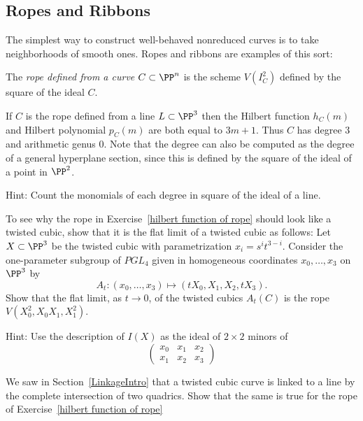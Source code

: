 \subsection{Ropes and Ribbons}
The simplest way to construct well-behaved nonreduced curves is
to take neighborhoods of smooth ones. Ropes and ribbons are examples of this sort:


\begin{definition}
The \emph{rope defined from a curve $C \subset \PP^n$} is the scheme $V(I^2_C)$ defined by the square of the ideal $C$.
\end{definition}

\begin{exercise}\label{hilbert function of rope}
If $C$ is the rope defined from a line $L\subset \PP^3$ then the Hilbert function $h_C(m)$ and Hilbert polynomial $p_C(m)$ are both equal to $3m+1$. Thus $C$ has degree 3 and
arithmetic genus 0. Note that the degree can also be computed as the degree of 
a general hyperplane section, since this is defined by the square of the ideal of a point
in $\PP^2$.

Hint: Count the monomials of each degree in square of the ideal of a line. 
\end{exercise}

\begin{exercise} To see why the rope in Exercise~\ref{hilbert function of rope} should look like a twisted cubic, show that it is the flat limit of a twisted cubic as follows:
 Let $X \subset \PP^3$ be the twisted cubic with parametrization $x_i = s^it^{3-i}$. Consider the one-parameter subgroup of $PGL_4$ given in homogeneous coordinates $x_0,\dots, x_3$ on $\PP^3$ by
$$
A_t : (x_0,\dots,x_3) \mapsto (tX_0, X_1, X_2,tX_3).
$$
Show that the flat limit, as $t\to 0$, of the twisted cubics $A_t(C)$ is the rope $V(X_0^2, X_0X_1,X_1^2)$.

Hint: Use the description of $I(X)$ as the ideal of $2\times 2$ minors of
$$
\begin{pmatrix}
 x_0 &x_1&x_2\\
x_1& x_2& x_3
\end{pmatrix}
$$
\end{exercise}
 
 
\begin{exercise}\label{line and rope}
We saw in Section~\ref{LinkageIntro} that a twisted cubic curve is linked to a line by the complete intersection
 of two quadrics. Show that the same is true for the rope of Exercise~\ref{hilbert function of rope} 
\end{exercise}
 

